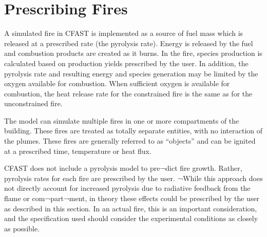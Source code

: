 \section{Prescribing Fires}

A simulated fire in CFAST is implemented as a source of fuel mass which is released at a prescribed rate (the pyrolysis rate). Energy is released by the fuel and combustion products are created as it burns. In the fire, species production is calculated based on production yields prescribed by the user. In addition, the pyrolysis rate and resulting energy and species generation may be limited by the oxygen available for combustion. When sufficient oxygen is available for combustion, the heat release rate for the constrained fire is the same as for the unconstrained fire.

The model can simulate multiple fires in one or more compartments of the building.  These fires are treated as totally separate entities, with no interaction of the plumes. These fires are generally referred to as “objects” and can be ignited at a prescribed time, temperature or heat flux.

CFAST does not include a pyrolysis model to pre¬dict fire growth. Rather, pyrolysis rates for each fire are prescribed by the user.  ¬While this approach does not directly account for increased pyrolysis due to radiative feedback from the flame or com¬part¬ment, in theory these effects could be prescribed by the user as described in this section.  In an actual fire, this is an important consideration, and the specification used should consider the experimental conditions as closely as possible.

